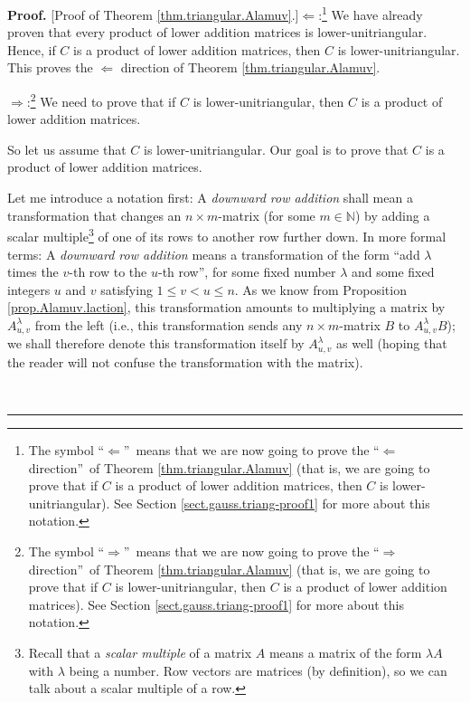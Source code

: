 \documentclass[numbers=enddot,12pt,final,onecolumn,notitlepage]{scrartcl}%
\theoremstyle{definition}
\newenvironment{proof}[1][Proof]{\noindent\textbf{#1.} }{\ \rule{0.5em}{0.5em}}
\begin{document}
\begin{proof}
[Proof of Theorem \ref{thm.triangular.Alamuv}.]$\Longleftarrow$:\footnote{The
symbol \textquotedblleft$\Longleftarrow$\textquotedblright\ means that we are
now going to prove the \textquotedblleft$\Longleftarrow$
direction\textquotedblright\ of Theorem \ref{thm.triangular.Alamuv} (that is,
we are going to prove that if $C$ is a product of lower addition matrices,
then $C$ is lower-unitriangular). See Section \ref{sect.gauss.triang-proof1}
for more about this notation.} We have already proven that every product of
lower addition matrices is lower-unitriangular. Hence, if $C$ is a product of
lower addition matrices, then $C$ is lower-unitriangular. This proves the
$\Longleftarrow$ direction of Theorem \ref{thm.triangular.Alamuv}.

$\Longrightarrow$:\footnote{The symbol \textquotedblleft$\Longrightarrow
$\textquotedblright\ means that we are now going to prove the
\textquotedblleft$\Longrightarrow$ direction\textquotedblright\ of Theorem
\ref{thm.triangular.Alamuv} (that is, we are going to prove that if $C$ is
lower-unitriangular, then $C$ is a product of lower addition matrices). See
Section \ref{sect.gauss.triang-proof1} for more about this notation.} We need
to prove that if $C$ is lower-unitriangular, then $C$ is a product of lower
addition matrices.

So let us assume that $C$ is lower-unitriangular. Our goal is to prove that
$C$ is a product of lower addition matrices.

Let me introduce a notation first: A \textit{downward row addition} shall mean
a transformation that changes an $n\times m$-matrix (for some $m \in
\mathbb{N}$) by adding a scalar multiple\footnote{Recall that a \textit{scalar
multiple} of a matrix $A$ means a matrix of the form $\lambda A$ with
$\lambda$ being a number. Row vectors are matrices (by definition), so we can
talk about a scalar multiple of a row.} of one of its rows to another row
further down. In more formal terms: A \textit{downward row addition} means a
transformation of the form ``add $\lambda$ times the $v$-th row to the $u$-th
row'', for some fixed number $\lambda$ and some fixed integers $u$ and $v$
satisfying $1 \leq v < u \leq n$. As we know from Proposition
\ref{prop.Alamuv.laction}, this transformation amounts to multiplying a matrix
by $A^{\lambda}_{u, v}$ from the left (i.e., this transformation sends any
$n\times m$-matrix $B$ to $A^{\lambda}_{u,v} B$); we shall therefore denote
this transformation itself by $A^{\lambda}_{u,v}$ as well (hoping that the
reader will not confuse the transformation with the matrix).


\end{proof}
\end{document}
